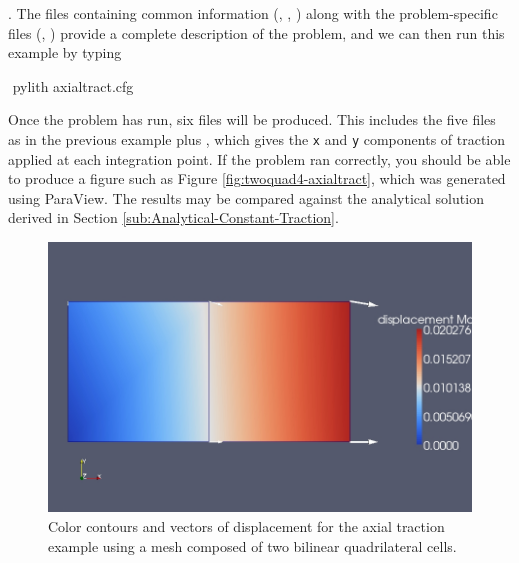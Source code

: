 .  The files containing common information
(, ,
) along with the problem-specific files
(, ) provide a
complete description of the problem, and we can then run this example
by typing
\begin{shell}
$$ pylith axialtract.cfg
\end{shell}
Once the problem has run, six files will be produced. This includes
the five files as in the previous example plus
, which gives the \texttt{x}
and \texttt{y} components of traction applied at each integration
point. If the problem ran correctly, you should be able to produce a
figure such as Figure \vref{fig:twoquad4-axialtract}, which was
generated using ParaView. The results may be compared against the
analytical solution derived in Section
\vref{sub:Analytical-Constant-Traction}.

\begin{figure}
  \includegraphics[scale=0.33]{examples/figs/twoquad4-axialtract}
  \caption{Color contours and vectors of displacement for the axial traction
    example using a mesh composed of two bilinear quadrilateral cells.}
  \label{fig:twoquad4-axialtract}
\end{figure}


